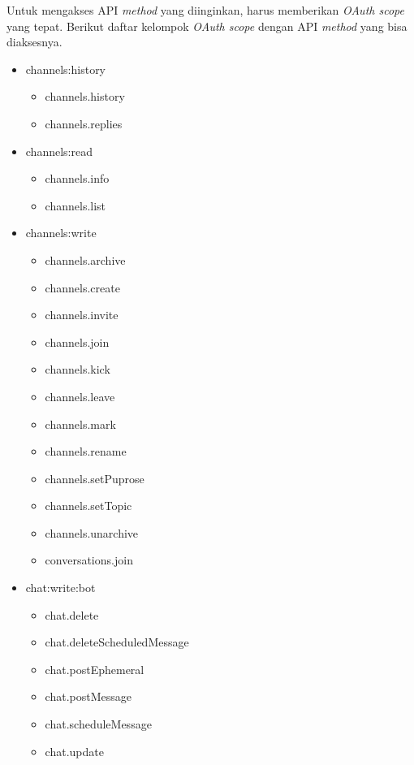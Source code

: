 Untuk mengakses API \textit{method} yang diinginkan, harus memberikan \textit{OAuth scope} yang tepat. Berikut daftar kelompok \textit{OAuth scope} dengan API \textit{method} yang bisa diaksesnya. 
\begin{multicols}{2}
\begin{itemize}
	\item channels:history
	\begin{itemize}
		\item channels.history
		\item channels.replies
	\end{itemize}
	
	\item channels:read
	\begin{itemize}
		\item channels.info
		\item channels.list
	\end{itemize}
	
	\item channels:write
	\begin{itemize}
		\item channels.archive
		\item channels.create
		\item channels.invite
		\item channels.join
		\item channels.kick
		\item channels.leave
		\item channels.mark
		\item channels.rename
		\item channels.setPuprose
		\item channels.setTopic
		\item channels.unarchive
		\item conversations.join
	\end{itemize}
	
	\item chat:write:bot
	\begin{itemize}
		\item chat.delete
		\item chat.deleteScheduledMessage
		\item chat.postEphemeral
		\item chat.postMessage
		\item chat.scheduleMessage
		\item chat.update
	\end{itemize}
	

\end{itemize}
\end{multicols}
